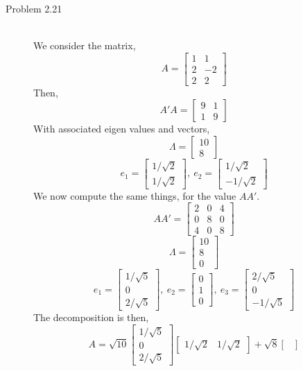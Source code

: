 \documentclass[letterpaper,10pt]{article}
\begin{document}
\begin{description}
\item[Problem 2.21]\hfill\\
We consider the matrix,
\[A=\begin{bmatrix}
1 & 1\\2 & -2\\2 & 2
\end{bmatrix}\]
Then,
\[A'A=\begin{bmatrix}
9 & 1\\1 & 9
\end{bmatrix}\]
With associated eigen values and vectors,
\[\Lambda=\begin{bmatrix}
10\\8
\end{bmatrix} \]
\[e_1=\begin{bmatrix}
1/\sqrt{2} \\ 1/\sqrt{2}
\end{bmatrix},\ e_2=\begin{bmatrix}
1/\sqrt{2} \\ -1/\sqrt{2}
\end{bmatrix} \]
We now compute the same things, for the value $AA'$.
\[AA'=\begin{bmatrix}
2 & 0 & 4\\
0 & 8 & 0\\
4 & 0 & 8
\end{bmatrix} \]
\[\Lambda=\begin{bmatrix}
10\\8\\0
\end{bmatrix} \]
\[e_1=\begin{bmatrix}
1/\sqrt{5}\\0\\2/\sqrt{5}
\end{bmatrix},\ e_2=\begin{bmatrix}
0\\1\\0
\end{bmatrix},\ e_3=\begin{bmatrix}
2/\sqrt{5}\\0\\-1/\sqrt{5}
\end{bmatrix} \]
The decomposition is then,
\[A=\sqrt{10}\begin{bmatrix}
1/\sqrt{5}\\0\\2/\sqrt{5}
\end{bmatrix}\begin{bmatrix}
1/\sqrt{2} & 1/\sqrt{2}
\end{bmatrix}+\sqrt{8}\begin{bmatrix}

\end{bmatrix}\]
\end{description}
\end{document}
